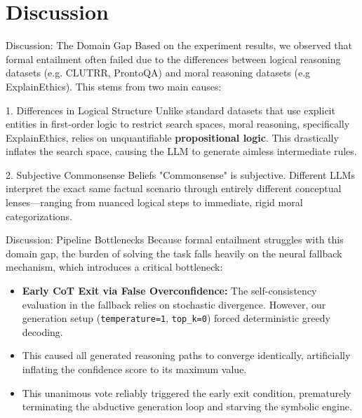 \documentclass{beamer}
\begin{document}
    \section{Discussion}

    \begin{frame}{Discussion: The Domain Gap}
        Based on the experiment results, we observed that formal entailment often failed due to the differences between logical reasoning datasets (e.g. CLUTRR, ProntoQA) and moral reasoning datasets (e.g ExplainEthics). This stems from two main causes:
        \vspace{0.25cm}
        \begin{block}{1. Differences in Logical Structure}
            Unlike standard datasets that use explicit entities in first-order logic to restrict search spaces, moral reasoning, specifically ExplainEthics, relies on unquantifiable \textbf{propositional logic}. This drastically inflates the search space, causing the LLM to generate aimless intermediate rules.
        \end{block}
        \begin{block}{2. Subjective Commonsense Beliefs}
            "Commonsense" is subjective. Different LLMs interpret the exact same factual scenario through entirely different conceptual lenses---ranging from nuanced logical steps to immediate, rigid moral categorizations.
        \end{block}
    \end{frame}

    \begin{frame}{Discussion: Pipeline Bottlenecks}
        Because formal entailment struggles with this domain gap, the burden of solving the task falls heavily on the neural fallback mechanism, which introduces a critical bottleneck:
        \vspace{0.25cm}
        \begin{itemize}
            \item \textbf{Early CoT Exit via False Overconfidence:} 
            The self-consistency evaluation in the fallback relies on stochastic divergence. However, our generation setup (\texttt{temperature=1}, \texttt{top\_k=0}) forced deterministic greedy decoding.
            \item This caused all generated reasoning paths to converge identically, artificially inflating the confidence score to its maximum value. 
            \item This unanimous vote reliably triggered the early exit condition, prematurely terminating the abductive generation loop and starving the symbolic engine.
        \end{itemize}
    \end{frame}
\end{document}
